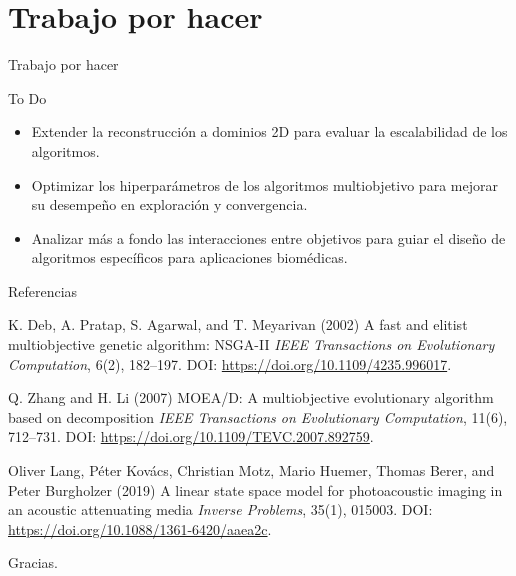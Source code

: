 \documentclass[aspectratio=169,xcolor=dvipsnames]{beamer}
\begin{document}
\section{Trabajo por hacer}
\begin{frame}{Trabajo por hacer}
    \begin{block}{To Do}
        \begin{itemize}
            \item Extender la reconstrucción a dominios 2D para evaluar la escalabilidad de los algoritmos.
            \item Optimizar los hiperparámetros de los algoritmos multiobjetivo para mejorar su desempeño en exploración y convergencia.
            \item Analizar más a fondo las interacciones entre objetivos para guiar el diseño de algoritmos específicos para aplicaciones biomédicas.
        \end{itemize}
    \end{block}
\end{frame}
    
        
    
        

\begin{frame}{Referencias}
    \footnotesize{
        \begin{thebibliography}{99}
             K. Deb, A. Pratap, S. Agarwal, and T. Meyarivan (2002)
            \newblock A fast and elitist multiobjective genetic algorithm: NSGA-II
            \newblock \emph{IEEE Transactions on Evolutionary Computation}, 6(2), 182–197. DOI: \url{https://doi.org/10.1109/4235.996017}.
            
             Q. Zhang and H. Li (2007)
            \newblock MOEA/D: A multiobjective evolutionary algorithm based on decomposition
            \newblock \emph{IEEE Transactions on Evolutionary Computation}, 11(6), 712–731. DOI: \url{https://doi.org/10.1109/TEVC.2007.892759}.
            
             Oliver Lang, Péter Kovács, Christian Motz, Mario Huemer, Thomas Berer, and Peter Burgholzer (2019)
            \newblock A linear state space model for photoacoustic imaging in an acoustic attenuating media
            \newblock \emph{Inverse Problems}, 35(1), 015003. DOI: \url{https://doi.org/10.1088/1361-6420/aaea2c}.
        \end{thebibliography}        
    }
\end{frame}


\begin{frame}
    \Huge{\centerline{Gracias.}}
\end{frame}

\end{document}
